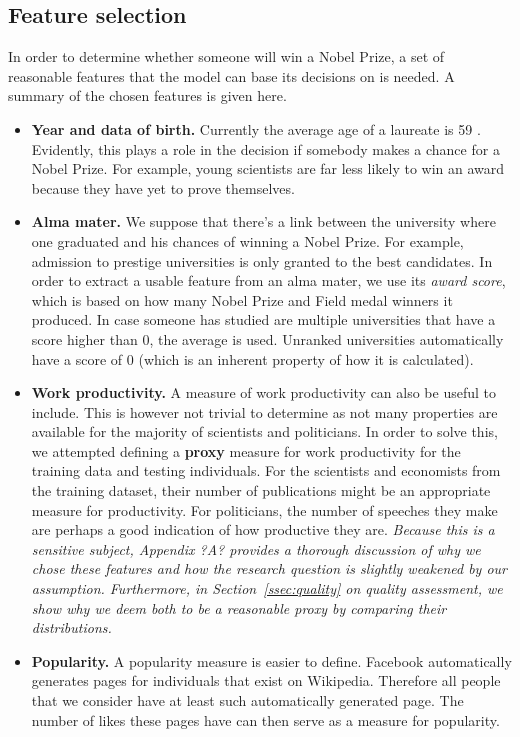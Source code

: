 \subsection{Feature selection}
\label{ssec:features}
In order to determine whether someone will win a Nobel Prize, a set of reasonable features that the model can base its decisions on is needed. A summary of the chosen features is given here. 
\begin{itemize}
\item \textbf{Year and data of birth.}
Currently the average age of a laureate is 59 \cite{age}. Evidently, this plays a role in the decision if somebody makes a chance for a Nobel Prize. For example, young scientists are far less likely to win an award because they have yet to prove themselves.
\item \textbf{Alma mater.} We suppose that there's a link between the university where one graduated and his chances of winning a Nobel Prize. For example, admission to prestige universities is only granted to the best candidates. In order to extract a usable feature from an alma mater, we use its \emph{award score}, which is based on how many Nobel Prize and Field medal winners it produced. In case someone has studied are multiple universities that have a score higher than 0, the average is used. Unranked universities automatically have a score of 0 (which is an inherent property of how it is calculated).
\item \textbf{Work productivity.} A measure of work productivity can also be useful to include. This is however not trivial to determine as not many properties are available for the majority of scientists and politicians. In order to solve this, we attempted defining a \textbf{proxy} measure for work productivity for the training data and testing individuals. For the scientists and economists from the training dataset, their number of publications might be an appropriate measure for productivity. For politicians, the number of speeches they make are perhaps a good indication of how productive they are. \emph{Because this is a sensitive subject, Appendix ?A? provides a thorough discussion of why we chose these features and how the research question is slightly weakened by our assumption. Furthermore, in Section~\ref{ssec:quality} on quality assessment, we show why we deem both to be a reasonable proxy by comparing their distributions.}
\item \textbf{Popularity.} A popularity measure is easier to define. Facebook automatically generates pages for individuals that exist on Wikipedia. Therefore all people that we consider have at least such automatically generated page. The number of likes these pages have can then serve as a measure for popularity. 
\end{itemize}

